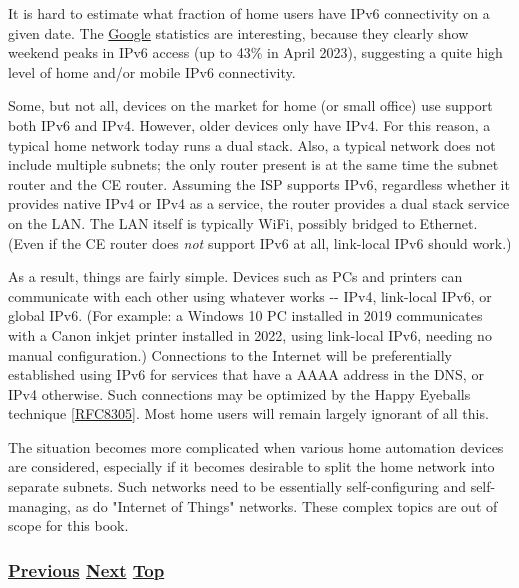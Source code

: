 \documentclass[
]{article}
\begin{document}
It is hard to estimate what fraction of home users have IPv6
connectivity on a given date. The
\href{https://www.google.com/intl/en/ipv6/statistics.html}{Google}
statistics are interesting, because they clearly show weekend peaks in
IPv6 access (up to 43\% in April 2023), suggesting a quite high level of
home and/or mobile IPv6 connectivity.

Some, but not all, devices on the market for home (or small office) use
support both IPv6 and IPv4. However, older devices only have IPv4. For
this reason, a typical home network today runs a dual stack. Also, a
typical network does not include multiple subnets; the only router
present is at the same time the subnet router and the CE router.
Assuming the ISP supports IPv6, regardless whether it provides native
IPv4 or IPv4 as a service, the router provides a dual stack service on
the LAN. The LAN itself is typically WiFi, possibly bridged to Ethernet.
(Even if the CE router does \emph{not} support IPv6 at all, link-local
IPv6 should work.)

As a result, things are fairly simple. Devices such as PCs and printers
can communicate with each other using whatever works -\/- IPv4,
link-local IPv6, or global IPv6. (For example: a Windows 10 PC installed
in 2019 communicates with a Canon inkjet printer installed in 2022,
using link-local IPv6, needing no manual configuration.) Connections to
the Internet will be preferentially established using IPv6 for services
that have a AAAA address in the DNS, or IPv4 otherwise. Such connections
may be optimized by the Happy Eyeballs technique
{[}\href{https://www.rfc-editor.org/info/rfc8305}{RFC8305}{]}. Most home
users will remain largely ignorant of all this.

The situation becomes more complicated when various home automation
devices are considered, especially if it becomes desirable to split the
home network into separate subnets. Such networks need to be essentially
self-configuring and self-managing, as do "Internet of Things" networks.
These complex topics are out of scope for this book.

\subsubsection{\texorpdfstring{\hyperref[deployment-by-carriers]{Previous}
\hyperref[deployment-in-the-enterprise]{Next}
\hyperref[deployment-status]{Top}}{Previous Next Top}}\label{previous-next-top-36}

\pagebreak
\end{document}

